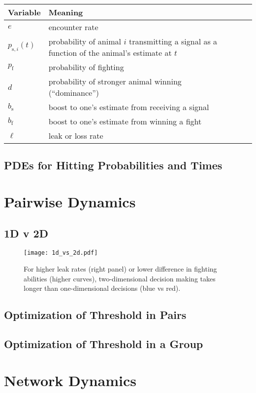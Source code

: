 \documentclass{article}
\begin{document}
\begin{table}
\caption{\label{variables}}
\begin{tabular}{llll}
Variable & Meaning  \\
\hline $e$ & encounter rate
\\ $p_{\text{s},i}(t)$ & probability of animal $i$ transmitting a signal as a function of the animal's estimate at $t$
\\ $p_{\text{f}}$ & probability of fighting
\\ $d$ & probability of stronger animal winning (``dominance'')
\\ $b_{\text{s}}$ & boost to one's estimate from receiving a signal
\\ $b_{\text{f}}$ & boost to one's estimate from winning a fight
\\ $\ell$ & leak or loss rate
\end{tabular}
\end{table}

\subsection{PDEs for Hitting Probabilities and Times}

\section{Pairwise Dynamics}

\subsection{1D v 2D}
\begin{figure}
\texttt{[image: 1d\_vs\_2d.pdf]}
\caption{ For higher leak rates (right panel) or lower difference in fighting abilities (higher curves), two-dimensional decision making takes longer than one-dimensional decisions (blue vs red).}
\end{figure}

\subsection{Optimization of Threshold in Pairs}

\subsection{Optimization of Threshold in a Group}

\section{Network Dynamics}
\end{document}
